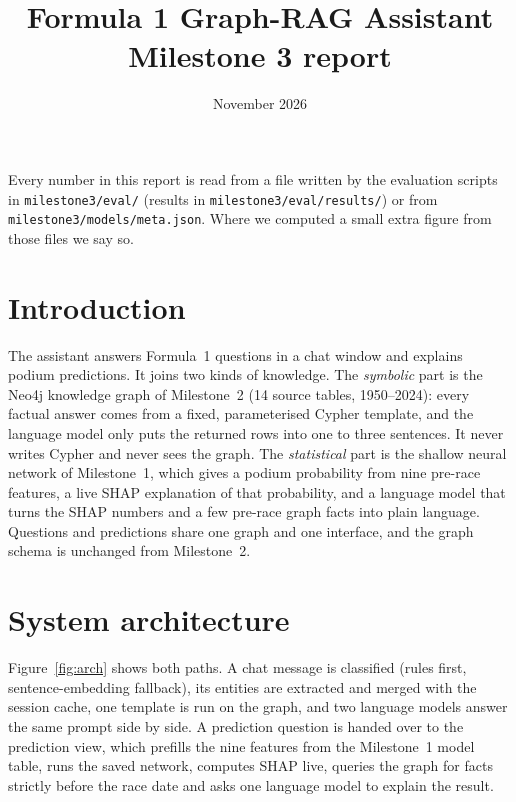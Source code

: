 \documentclass[10pt,a4paper]{article}
\title{Formula 1 Graph-RAG Assistant\\\large Milestone 3 report}
\author{\teammembers}
\date{November 2026}
\newcommand{\code}[1]{\texttt{#1}}
\begin{document}
\maketitle

\noindent Every number in this report is read from a file written by the evaluation scripts in \code{milestone3/eval/} (results in \code{milestone3/eval/results/}) or from \code{milestone3/models/meta.json}. Where we computed a small extra figure from those files we say so.

\section{Introduction}

The assistant answers Formula~1 questions in a chat window and explains podium predictions. It joins two kinds of knowledge. The \emph{symbolic} part is the Neo4j knowledge graph of Milestone~2 (14 source tables, 1950--2024): every factual answer comes from a fixed, parameterised Cypher template, and the language model only puts the returned rows into one to three sentences. It never writes Cypher and never sees the graph. The \emph{statistical} part is the shallow neural network of Milestone~1, which gives a podium probability from nine pre-race features, a live SHAP explanation of that probability, and a language model that turns the SHAP numbers and a few pre-race graph facts into plain language. Questions and predictions share one graph and one interface, and the graph schema is unchanged from Milestone~2.

\section{System architecture}

Figure~\ref{fig:arch} shows both paths. A chat message is classified (rules first, sentence-embedding fallback), its entities are extracted and merged with the session cache, one template is run on the graph, and two language models answer the same prompt side by side. A prediction question is handed over to the prediction view, which prefills the nine features from the Milestone~1 model table, runs the saved network, computes SHAP live, queries the graph for facts strictly before the race date and asks one language model to explain the result.
\end{document}
